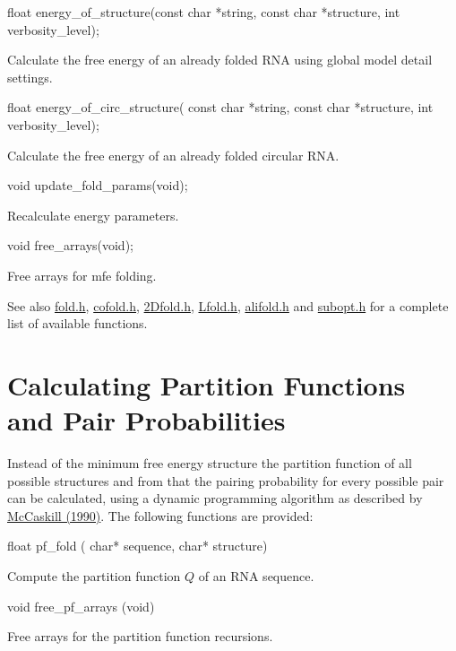 \begin{DoxyVerb}
float energy_of_structure(const char *string,
                          const char *structure,
                          int verbosity_level);
\end{DoxyVerb}
 Calculate the free energy of an already folded RNA using global model detail settings. 

\begin{DoxyVerb}
float energy_of_circ_structure( const char *string,
                                const char *structure,
                                int verbosity_level);
\end{DoxyVerb}
 Calculate the free energy of an already folded circular RNA. 

\begin{DoxyVerb}
void  update_fold_params(void);
\end{DoxyVerb}
 Recalculate energy parameters. 

\begin{DoxyVerb}
void  free_arrays(void);
\end{DoxyVerb}
 Free arrays for mfe folding. 

\begin{DoxySeeAlso}{See also}
\hyperlink{fold_8h}{fold.h}, \hyperlink{cofold_8h}{cofold.h}, \hyperlink{2Dfold_8h}{2Dfold.h}, \hyperlink{Lfold_8h}{Lfold.h}, \hyperlink{alifold_8h}{alifold.h} and \hyperlink{subopt_8h}{subopt.h} for a complete list of available functions.
\end{DoxySeeAlso}
\hypertarget{mp__fold_mp_PF_Fold}{}\section{Calculating Partition Functions and Pair Probabilities}\label{mp__fold_mp_PF_Fold}
Instead of the minimum free energy structure the partition function of all possible structures and from that the pairing probability for every possible pair can be calculated, using a dynamic programming algorithm as described by \hyperlink{mp__ref_mccaskill_90}{McCaskill (1990)}. The following functions are provided:

\begin{DoxyVerb}
float pf_fold ( char* sequence,
                char* structure)
\end{DoxyVerb}
 Compute the partition function $Q$ of an RNA sequence. 

\begin{DoxyVerb}
void free_pf_arrays (void)
\end{DoxyVerb}
 Free arrays for the partition function recursions. 


